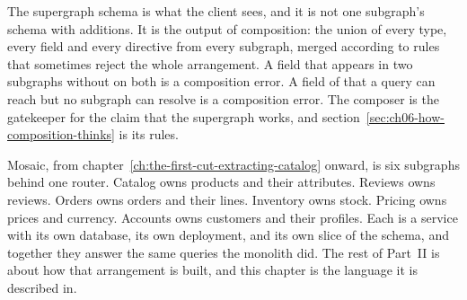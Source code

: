 %
The supergraph schema is what the client sees, and it is not one subgraph's
schema with additions. It is the output of composition: the union of every type,
every field and every directive from every subgraph, merged according to rules
that sometimes reject the whole arrangement. A field that appears in two
subgraphs without  on both is a composition error. A field of
 that a query can reach but no subgraph can resolve is a
composition error. The composer is the gatekeeper for the claim that the
supergraph works, and section~\ref{sec:ch06-how-composition-thinks} is its
rules.

%
Mosaic, from chapter~\ref{ch:the-first-cut-extracting-catalog} onward, is six
subgraphs behind one router. Catalog owns products and their attributes.
Reviews owns reviews. Orders owns orders and their lines. Inventory owns stock.
Pricing owns prices and currency. Accounts owns customers and their profiles.
Each is a service with its own database, its own deployment, and its own slice
of the schema, and together they answer the same queries the monolith did. The
rest of Part~II is about how that arrangement is built, and this chapter is the
language it is described in.

%
